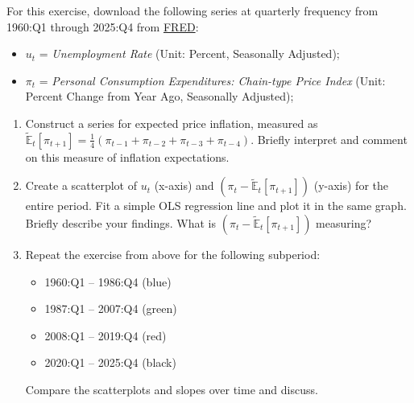 \documentclass[dvipsnames,11pt]{article}
\begin{document}
        For this exercise, download the following series at quarterly frequency from 1960:Q1 through 2025:Q4 from \href{https://fred.stlouisfed.org}{FRED}:
        \begin{itemize}
            \item $u_t$ = \textit{Unemployment Rate} (Unit: Percent, Seasonally Adjusted);
            
            \item $\pi_t$ = \textit{Personal Consumption Expenditures: Chain-type Price Index} (Unit: Percent Change from Year Ago, Seasonally Adjusted);
        \end{itemize}
        
        \begin{enumerate}
            \item Construct a series for expected price inflation, measured as $\mathbb{\widetilde{E}}_{t}[\pi_{t+1}] = \frac{1}{4}(\pi_{t-1} + \pi_{t-2} + \pi_{t-3} + \pi_{t-4})$. Briefly interpret and comment on this measure of inflation expectations.  

                \begin{solution}

                    
                    
                \end{solution}
            
            \item Create a scatterplot of \(u_t\) (x-axis) and \( (\pi_t - \mathbb{\widetilde{E}}_{t}[\pi_{t+1}] ) \) (y-axis) for the entire period. Fit a simple OLS regression line and plot it in the same graph. Briefly describe your findings. What is \( (\pi_t - \mathbb{\widetilde{E}}_{t}[\pi_{t+1}] ) \) measuring? 
            \item Repeat the exercise from above for the following subperiod:
            \begin{itemize}
                \item[a.] 1960:Q1 -- 1986:Q4 (blue)
                \item[b.] 1987:Q1 -- 2007:Q4 (green)
                \item[c.] 2008:Q1 -- 2019:Q4 (red)
                \item[d.] 2020:Q1 -- 2025:Q4 (black)
            \end{itemize}
            Compare the scatterplots and slopes  over time and discuss.
    
                \begin{solution}

                    
                    
                \end{solution}
            
        \end{enumerate}
\end{document}

